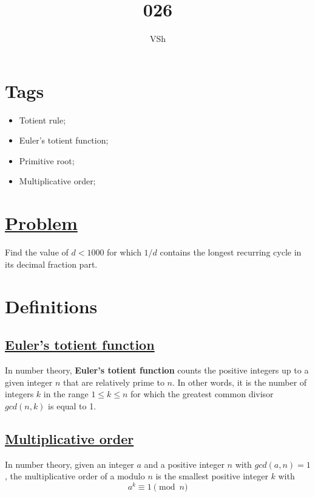 \documentclass{article}
\begin{document}
\title{026}
\author{VSh}

\maketitle

\section{Tags}
\begin{itemize}
    \item Totient rule;
    \item Euler's totient function;
    \item Primitive root;
    \item Multiplicative order;
\end{itemize}

\section{\href{https://projecteuler.net/problem=26}{Problem}}
Find the value of $d < 1000$ for which $1/d$ contains the longest recurring cycle 
in its decimal fraction part.

\section{Definitions}
\subsection{\href{https://en.wikipedia.org/wiki/Euler's_totient_function}{Euler's totient function}}
In number theory, \textbf{Euler's totient function} counts the positive integers up to a 
given integer $n$ that are relatively prime to $n$.  In other words, it is the 
number of integers $k$ in the range $1 \le k \le n$ for which the greatest common 
divisor $gcd(n, k)$ is equal to 1.

\subsection{\href{https://en.wikipedia.org/wiki/Multiplicative_order}{Multiplicative order}}
In number theory, given an integer $a$ and a positive integer $n$ with $gcd(a,n) = 1$, 
the multiplicative order of a modulo $n$ is the smallest positive integer $k$ with
\begin{equation*}
    a^k \equiv 1 \pmod{n}
\end{equation*}
\end{document}
